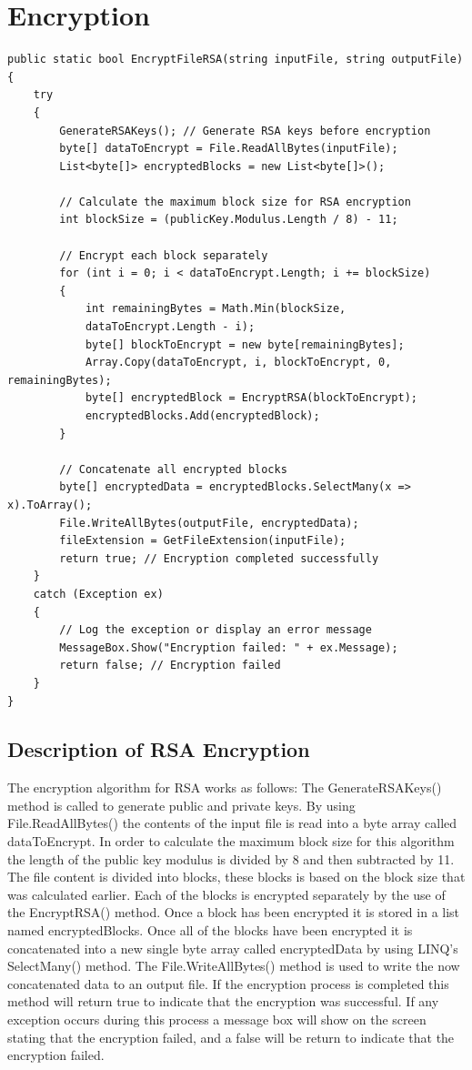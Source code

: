 \documentclass[a4paper,oneside,11pt]{book}
\begin{document}
\section{Encryption}
\begin{lstlisting}[language=Csh, caption={Code for RSA Encryption}]
public static bool EncryptFileRSA(string inputFile, string outputFile)
{
    try
    {
        GenerateRSAKeys(); // Generate RSA keys before encryption
        byte[] dataToEncrypt = File.ReadAllBytes(inputFile);
        List<byte[]> encryptedBlocks = new List<byte[]>();
    
        // Calculate the maximum block size for RSA encryption
        int blockSize = (publicKey.Modulus.Length / 8) - 11; 
    
        // Encrypt each block separately
        for (int i = 0; i < dataToEncrypt.Length; i += blockSize)
        {
            int remainingBytes = Math.Min(blockSize, 
            dataToEncrypt.Length - i);
            byte[] blockToEncrypt = new byte[remainingBytes];
            Array.Copy(dataToEncrypt, i, blockToEncrypt, 0, remainingBytes);    
            byte[] encryptedBlock = EncryptRSA(blockToEncrypt);
            encryptedBlocks.Add(encryptedBlock);
        }
    
        // Concatenate all encrypted blocks
        byte[] encryptedData = encryptedBlocks.SelectMany(x => x).ToArray();
        File.WriteAllBytes(outputFile, encryptedData);
        fileExtension = GetFileExtension(inputFile);
        return true; // Encryption completed successfully
    }
    catch (Exception ex)
    {
        // Log the exception or display an error message
        MessageBox.Show("Encryption failed: " + ex.Message);
        return false; // Encryption failed
    }
}
\end{lstlisting}

\subsection{Description of RSA Encryption}

The encryption algorithm for RSA works as follows:
The GenerateRSAKeys() method is called to generate public and private keys. By using File.ReadAllBytes() the contents of the input file is read into a byte array called dataToEncrypt. In order to calculate the maximum block size for this algorithm the length of the public key modulus is divided by 8 and then subtracted by 11. The file content is divided into blocks, these blocks is based on the block size that was calculated earlier. Each of the blocks is encrypted separately by the use of the EncryptRSA() method. Once a block has been encrypted it is stored in a list named encryptedBlocks. Once all of the blocks have been encrypted it is concatenated into a new single byte array called encryptedData by using LINQ's SelectMany() method. The File.WriteAllBytes() method is used to write the now concatenated data to an output file. If the encryption process is completed this method will return true to indicate that the encryption was successful. If any exception occurs during this process a message box will show on the screen stating that the encryption failed, and a false will be return to indicate that the encryption failed.
\end{document}

